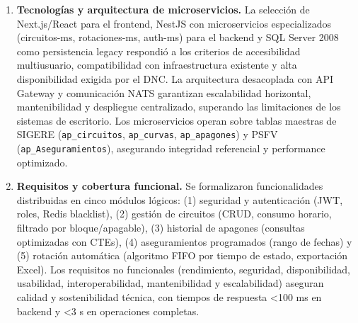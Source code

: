 \begin{enumerate}
    \item \textbf{Tecnologías y arquitectura de microservicios.} La selección de Next.js/React para el frontend, NestJS con microservicios especializados (circuitos-ms, rotaciones-ms, auth-ms) para el backend y SQL Server 2008 como persistencia legacy respondió a los criterios de accesibilidad multiusuario, compatibilidad con infraestructura existente y alta disponibilidad exigida por el DNC. La arquitectura desacoplada con API Gateway y comunicación NATS garantizan escalabilidad horizontal, mantenibilidad y despliegue centralizado, superando las limitaciones de los sistemas de escritorio. Los microservicios operan sobre tablas maestras de SIGERE (\texttt{ap\_circuitos}, \texttt{ap\_curvas}, \texttt{ap\_apagones}) y PSFV (\texttt{ap\_Aseguramientos}), asegurando integridad referencial y performance optimizado.
    
    \item \textbf{Requisitos y cobertura funcional.} Se formalizaron funcionalidades distribuidas en cinco módulos lógicos: (1) seguridad y autenticación (JWT, roles, Redis blacklist), (2) gestión de circuitos (CRUD, consumo horario, filtrado por bloque/apagable), (3) historial de apagones (consultas optimizadas con CTEs), (4) aseguramientos programados (rango de fechas) y (5) rotación automática (algoritmo FIFO por tiempo de estado, exportación Excel). Los requisitos no funcionales (rendimiento, seguridad, disponibilidad, usabilidad, interoperabilidad, mantenibilidad y escalabilidad) aseguran calidad y sostenibilidad técnica, con tiempos de respuesta <100 ms en backend y <3 s en operaciones completas.
\end{enumerate}